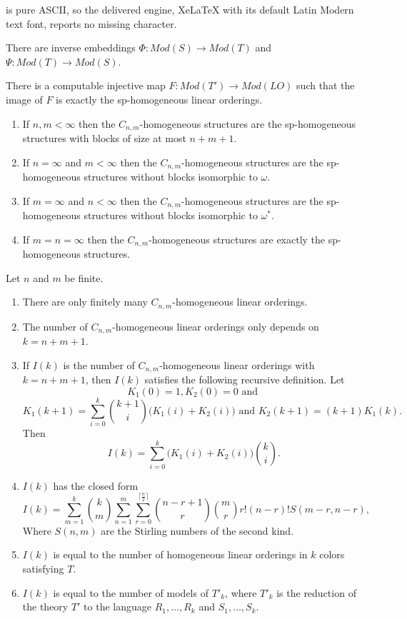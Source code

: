 \documentclass[10pt,a4paper]{amsart}
\begin{document}
is pure ASCII, so the delivered engine, XeLaTeX with its default Latin Modern text font, reports no missing character.
\begin{proposition}\label{prop:coloriffSp}
There are inverse embeddings $\Phi:Mod(S)\to Mod(T)$ and $\Psi:Mod(T)\to Mod(S)$.
\end{proposition}

\begin{proposition}\label{prop:spImage}
    There is a computable injective map $F:Mod(T')\to Mod(LO)$ such that the image of $F$ is exactly the sp-homogeneous linear orderings. 
\end{proposition}

\begin{theorem}\label{thm:CnmClassify}
    \begin{enumerate}
        \item If $n,m<\infty$ then the $C_{n,m}$-homogeneous structures are the sp-homogeneous structures with blocks of size at most $n+m+1$.
        \item If $n=\infty$ and $m<\infty$ then the $C_{n,m}$-homogeneous structures are the sp-homogeneous structures without blocks isomorphic to $\omega$.
        \item If $m=\infty$ and $n<\infty$ then the $C_{n,m}$-homogeneous structures are the sp-homogeneous structures without blocks isomorphic to $\omega^*$.
        \item If $m=n=\infty$ then the $C_{n,m}$-homogeneous structures are exactly the sp-homogeneous structures.
    \end{enumerate}
\end{theorem}

\begin{theorem}
Let $n$ and $m$ be finite.
\begin{enumerate}
    \item There are only finitely many $C_{n,m}$-homogeneous linear orderings.
    \item The number of $C_{n,m}$-homogeneous linear orderings only depends on $k=n+m+1$.
    \item If $I(k)$ is the number of $C_{n,m}$-homogeneous linear orderings with $k=n+m+1$, then $I(k)$ satisfies the following recursive definition.
    Let
    \[K_1(0)=1,K_2(0)=0 \text{ and }\] 
    \[K_1(k+1)= \sum_{i=0}^{k} {k+1 \choose i} \big(K_1(i)+K_2(i)\big) \text{ and } K_2(k+1)=(k+1)K_1(k).\]
    Then
    \[I(k)=\sum_{i=0}^{k} \big(K_1(i)+K_2(i)\big) {k \choose i}.\]
    \item $I(k)$ has the closed form
    \[I(k)=\sum_{m=1}^k{k \choose m}\sum_{n=1}^m\sum_{r=0}^{\lceil \frac{n}2 \rceil}{n-r+1 \choose r}{m \choose r}r!(n-r)!S(m-r,n-r),\]
    Where $S(n,m)$ are the Stirling numbers of the second kind.
    \item $I(k)$ is equal to the number of homogeneous linear orderings in $k$ colors satisfying $T$.
    \item $I(k)$ is equal to the number of models of $T'_k$, where $T'_k$ is the reduction of the theory $T'$ to the language $R_1,\dots,R_k$ and $S_1,\dots,S_k$.
\end{enumerate}
     
\end{theorem}
\end{document}
